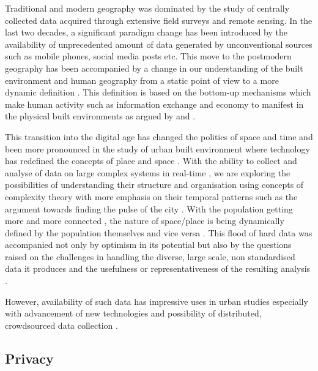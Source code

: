 Traditional and modern geography was dominated by the study of centrally collected data acquired through extensive field surveys and remote sensing.
In the last two decades, a significant paradigm change has been introduced by the availability of unprecedented amount of data generated by unconventional sources such as mobile phones, social media posts etc.
This move to the postmodern geography has been accompanied by a change in our understanding of the built environment and human geography from a static point of view to a more dynamic definition \cite{soja1989}.
This definition is based on the bottom-up mechanisms which make human activity such as information exchange and economy to manifest in the physical built environments as argued by \citep{batty1990, batty1997, batty2012} and \citep{batty2013, batty2013a}.

This transition into the digital age \citep{graham1999, tranos2012, tranos2013} has changed the politics of space and time \citep{massey1992} and been more pronounced in the study of urban built environment where technology has redefined the concepts of place and space \citep{graham2001, graham2002, sassen2001}.
With the ability to collect and analyse of data on large complex systems in real-time \citep{graham1997}, we are exploring the possibilities of understanding their structure and organisation using concepts of complexity theory \citep{bettencourt2013, portugali2012} with more emphasis on their temporal patterns such as the argument towards finding the pulse of the city \citep{batty2010}.
With the population getting more and more connected \citep{castells2010}, the nature of space/place is being dynamically defined by the population themselves \citep{giuliano1991} and vice versa \citep{zandvliet2006}.
This flood of hard data \cite{nature2008} was accompanied not only by optimism in its potential \citep{thomas2001} but also by the questions raised on the challenges in handling the diverse, large scale, non standardised data it produces and the usefulness or representativeness of the resulting analysis \citep{miller2010, arribas-bel2014a}.

However, availability of such data has impressive uses in urban studies \citep{bettencourt2014} especially with advancement of new technologies \citep{steenbruggen2013} and possibility of distributed, crowdsourced data collection \citep{lokanathan2015}.

\subsection{Privacy}

